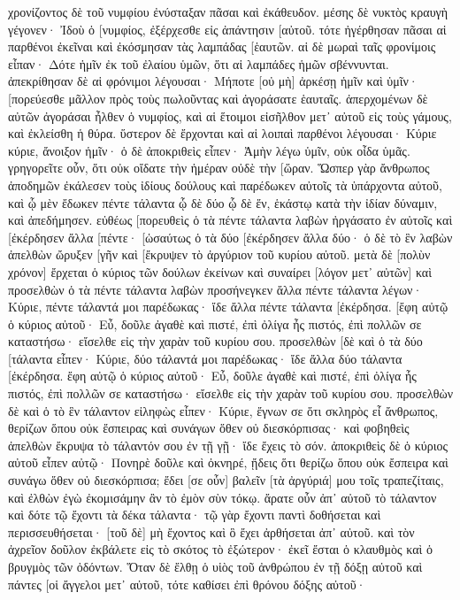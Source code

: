 χρονίζοντος δὲ τοῦ νυμφίου ἐνύσταξαν πᾶσαι καὶ ἐκάθευδον. 
μέσης δὲ νυκτὸς κραυγὴ γέγονεν· Ἰδοὺ ὁ [νυμφίος, ἐξέρχεσθε εἰς ἀπάντησιν [αὐτοῦ. 
τότε ἠγέρθησαν πᾶσαι αἱ παρθένοι ἐκεῖναι καὶ ἐκόσμησαν τὰς λαμπάδας [ἑαυτῶν. 
αἱ δὲ μωραὶ ταῖς φρονίμοις εἶπαν· Δότε ἡμῖν ἐκ τοῦ ἐλαίου ὑμῶν, ὅτι αἱ λαμπάδες ἡμῶν σβέννυνται. 
ἀπεκρίθησαν δὲ αἱ φρόνιμοι λέγουσαι· Μήποτε [οὐ μὴ] ἀρκέσῃ ἡμῖν καὶ ὑμῖν· [πορεύεσθε μᾶλλον πρὸς τοὺς πωλοῦντας καὶ ἀγοράσατε ἑαυταῖς. 
ἀπερχομένων δὲ αὐτῶν ἀγοράσαι ἦλθεν ὁ νυμφίος, καὶ αἱ ἕτοιμοι εἰσῆλθον μετ᾽ αὐτοῦ εἰς τοὺς γάμους, καὶ ἐκλείσθη ἡ θύρα. 
ὕστερον δὲ ἔρχονται καὶ αἱ λοιπαὶ παρθένοι λέγουσαι· Κύριε κύριε, ἄνοιξον ἡμῖν· 
ὁ δὲ ἀποκριθεὶς εἶπεν· Ἀμὴν λέγω ὑμῖν, οὐκ οἶδα ὑμᾶς. 
γρηγορεῖτε οὖν, ὅτι οὐκ οἴδατε τὴν ἡμέραν οὐδὲ τὴν [ὥραν. 
Ὥσπερ γὰρ ἄνθρωπος ἀποδημῶν ἐκάλεσεν τοὺς ἰδίους δούλους καὶ παρέδωκεν αὐτοῖς τὰ ὑπάρχοντα αὐτοῦ, 
καὶ ᾧ μὲν ἔδωκεν πέντε τάλαντα ᾧ δὲ δύο ᾧ δὲ ἕν, ἑκάστῳ κατὰ τὴν ἰδίαν δύναμιν, καὶ ἀπεδήμησεν. εὐθέως 
[πορευθεὶς ὁ τὰ πέντε τάλαντα λαβὼν ἠργάσατο ἐν αὐτοῖς καὶ [ἐκέρδησεν ἄλλα [πέντε· 
[ὡσαύτως ὁ τὰ δύο [ἐκέρδησεν ἄλλα δύο· 
ὁ δὲ τὸ ἓν λαβὼν ἀπελθὼν ὤρυξεν [γῆν καὶ [ἔκρυψεν τὸ ἀργύριον τοῦ κυρίου αὐτοῦ. 
μετὰ δὲ [πολὺν χρόνον] ἔρχεται ὁ κύριος τῶν δούλων ἐκείνων καὶ συναίρει [λόγον μετ᾽ αὐτῶν] 
καὶ προσελθὼν ὁ τὰ πέντε τάλαντα λαβὼν προσήνεγκεν ἄλλα πέντε τάλαντα λέγων· Κύριε, πέντε τάλαντά μοι παρέδωκας· ἴδε ἄλλα πέντε τάλαντα [ἐκέρδησα. 
[ἔφη αὐτῷ ὁ κύριος αὐτοῦ· Εὖ, δοῦλε ἀγαθὲ καὶ πιστέ, ἐπὶ ὀλίγα ἦς πιστός, ἐπὶ πολλῶν σε καταστήσω· εἴσελθε εἰς τὴν χαρὰν τοῦ κυρίου σου. 
προσελθὼν [δὲ καὶ ὁ τὰ δύο [τάλαντα εἶπεν· Κύριε, δύο τάλαντά μοι παρέδωκας· ἴδε ἄλλα δύο τάλαντα [ἐκέρδησα. 
ἔφη αὐτῷ ὁ κύριος αὐτοῦ· Εὖ, δοῦλε ἀγαθὲ καὶ πιστέ, ἐπὶ ὀλίγα ἦς πιστός, ἐπὶ πολλῶν σε καταστήσω· εἴσελθε εἰς τὴν χαρὰν τοῦ κυρίου σου. 
προσελθὼν δὲ καὶ ὁ τὸ ἓν τάλαντον εἰληφὼς εἶπεν· Κύριε, ἔγνων σε ὅτι σκληρὸς εἶ ἄνθρωπος, θερίζων ὅπου οὐκ ἔσπειρας καὶ συνάγων ὅθεν οὐ διεσκόρπισας· 
καὶ φοβηθεὶς ἀπελθὼν ἔκρυψα τὸ τάλαντόν σου ἐν τῇ γῇ· ἴδε ἔχεις τὸ σόν. 
ἀποκριθεὶς δὲ ὁ κύριος αὐτοῦ εἶπεν αὐτῷ· Πονηρὲ δοῦλε καὶ ὀκνηρέ, ᾔδεις ὅτι θερίζω ὅπου οὐκ ἔσπειρα καὶ συνάγω ὅθεν οὐ διεσκόρπισα; 
ἔδει [σε οὖν] βαλεῖν [τὰ ἀργύριά] μου τοῖς τραπεζίταις, καὶ ἐλθὼν ἐγὼ ἐκομισάμην ἂν τὸ ἐμὸν σὺν τόκῳ. 
ἄρατε οὖν ἀπ᾽ αὐτοῦ τὸ τάλαντον καὶ δότε τῷ ἔχοντι τὰ δέκα τάλαντα· 
τῷ γὰρ ἔχοντι παντὶ δοθήσεται καὶ περισσευθήσεται· [τοῦ δὲ] μὴ ἔχοντος καὶ ὃ ἔχει ἀρθήσεται ἀπ᾽ αὐτοῦ. 
καὶ τὸν ἀχρεῖον δοῦλον ἐκβάλετε εἰς τὸ σκότος τὸ ἐξώτερον· ἐκεῖ ἔσται ὁ κλαυθμὸς καὶ ὁ βρυγμὸς τῶν ὀδόντων. 
Ὅταν δὲ ἔλθῃ ὁ υἱὸς τοῦ ἀνθρώπου ἐν τῇ δόξῃ αὐτοῦ καὶ πάντες [οἱ ἄγγελοι μετ᾽ αὐτοῦ, τότε καθίσει ἐπὶ θρόνου δόξης αὐτοῦ· 
